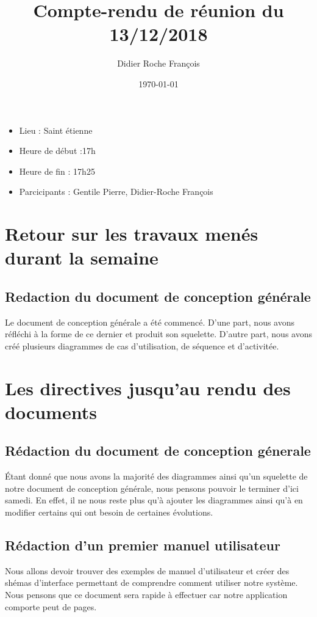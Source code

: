 \documentclass[a4paper]{article}
\title{Compte-rendu de réunion du 13/12/2018}
\author{Didier Roche François}
\date{\today}
\begin{document}
\renewcommand{\contentsname}{Ordre du jour}
\maketitle
\thispagestyle{fancy}


\begin{itemize}
\item Lieu : Saint étienne
\item Heure de début :17h
\item Heure de fin : 17h25
\item Parcicipants : Gentile Pierre, Didier-Roche François
\end{itemize}

\bigbreak
\bigbreak
\bigbreak

\tableofcontents


\newpage

\section{Retour sur les travaux menés durant la semaine}
\subsection{Redaction du document de conception générale}
Le document de conception générale a été commencé. D'une part, nous avons réfléchi à la forme de ce dernier et produit son squelette. D'autre part, nous avons créé plusieurs diagrammes de cas d'utilisation, de séquence et d'activitée.


\section{Les directives jusqu'au rendu des documents}
\subsection{Rédaction du document de conception génerale}
Étant donné que nous avons la majorité des diagrammes ainsi qu'un squelette de notre document de conception générale, nous pensons pouvoir le terminer d'ici samedi. En effet, il ne nous reste plus qu'à ajouter les diagrammes ainsi qu'à en modifier certains qui ont besoin de certaines évolutions.
\subsection{Rédaction d'un premier manuel utilisateur}
Nous allons devoir trouver des exemples de manuel d'utilisateur et créer des shémas d'interface permettant de comprendre comment utiliser notre système. Nous pensons que ce document sera rapide à effectuer car notre application comporte peut de pages.
\end{document}
